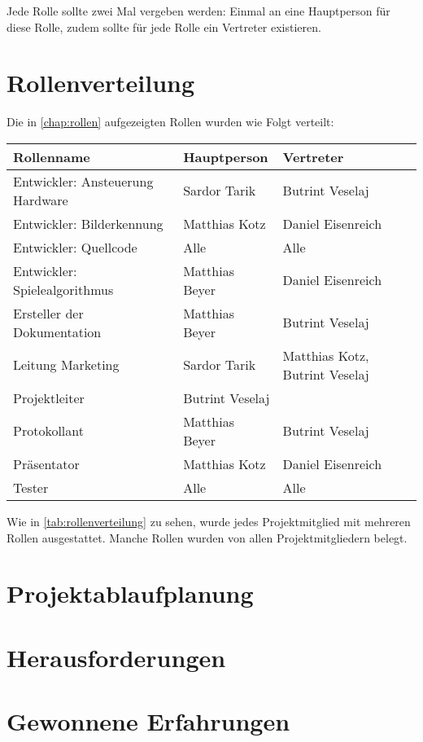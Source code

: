         Jede Rolle sollte zwei Mal vergeben werden: Einmal an eine Hauptperson
        für diese Rolle, zudem sollte für jede Rolle ein Vertreter existieren.

    \section{Rollenverteilung}

        Die in \autoref{chap:rollen} aufgezeigten Rollen wurden wie Folgt
        verteilt:

        \begin{center}
            \begin{tabular}{l | l | l }
                Rollenname                       & Hauptperson     & Vertreter \\

                \hline

                Entwickler: Ansteuerung Hardware & Sardor Tarik    & Butrint Veselaj \\
                Entwickler: Bilderkennung        & Matthias Kotz   & Daniel Eisenreich \\
                Entwickler: Quellcode            & Alle            & Alle \\
                Entwickler: Spielealgorithmus    & Matthias Beyer  & Daniel Eisenreich \\
                Ersteller der Dokumentation      & Matthias Beyer  & Butrint Veselaj \\
                Leitung Marketing                & Sardor Tarik    & Matthias Kotz, Butrint Veselaj \\
                Projektleiter                    & Butrint Veselaj & \\
                Protokollant                     & Matthias Beyer  & Butrint Veselaj \\
                Präsentator                      & Matthias Kotz   & Daniel Eisenreich \\
                Tester                           & Alle            & Alle \\
            \end{tabular}
            \label{tab:rollenverteilung}
        \end{center}

        Wie in \autoref{tab:rollenverteilung} zu sehen, wurde jedes
        Projektmitglied mit mehreren Rollen ausgestattet.
        Manche Rollen wurden von allen Projektmitgliedern belegt.

    \section{Projektablaufplanung}

        \notAvailable{}

    \section{Herausforderungen}

        \notAvailable{}

    \section{Gewonnene Erfahrungen}

        \notAvailable{}

